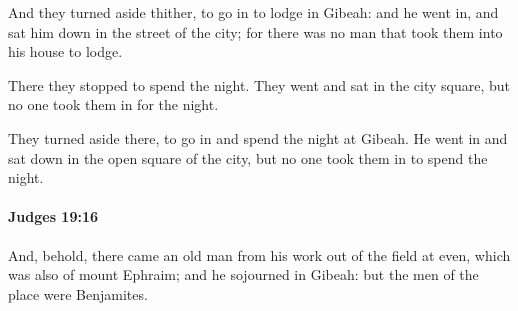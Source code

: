 			\begin{versebox}
					\item[BHS] 
					\item[ASV] And they turned aside thither, to go in to lodge in Gibeah: and he went in, and sat him down in the street of the city; for there was no man that took them into his house to lodge.
					\item[NIV] There they stopped to spend the night. They went and sat in the city square, but no one took them in for the night.
					\item[NRSV] They turned aside there, to go in and spend the night at Gibeah. He went in and sat down in the open square of the city, but no one took them in to spend the night.
			\end{versebox}

		\paragraph{Judges 19:16} %
			\label{JUDGES-19-16}

			And, behold, there came an old man from his work out of the field at even, which was also of mount Ephraim; and he sojourned in Gibeah: but the men of the place were Benjamites.

